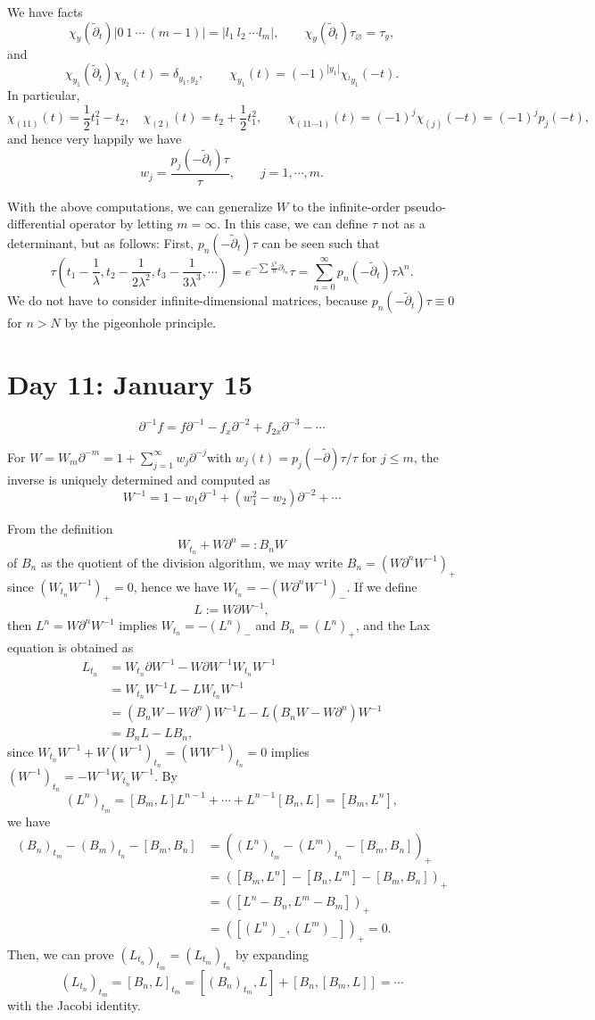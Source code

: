 \documentclass{../../../small}
\begin{document}
We have facts
\[\chi_y(\tilde\partial_t)|0\ 1\ \cdots\ (m-1)|=|l_1\ l_2\ \cdots l_m|,\qquad\chi_y(\tilde\partial_t)\tau_\varnothing=\tau_y,\]
and
\[\chi_{y_1}(\tilde\partial_t)\chi_{y_2}(t)=\delta_{y_1,y_2},\qquad\chi_{y_1}(t)=(-1)^{|y_1|}\chi_{^ty_1}(-t).\]
In particular,
\[\chi_{(11)}(t)=\frac12t_1^2-t_2,\quad\chi_{(2)}(t)=t_2+\frac12t_1^2,\qquad\chi_{(11\cdots1)}(t)=(-1)^j\chi_{(j)}(-t)=(-1)^jp_j(-t),\]
and hence very happily we have
\[w_j=\frac{p_j(-\tilde\partial_t)\tau}{\tau},\qquad j=1,\cdots,m.\]

With the above computations, we can generalize $W$ to the infinite-order pseudo-differential operator by letting $m=\infty$.
In this case, we can define $\tau$ not as a determinant, but as follows:
First, $p_n(-\tilde\partial_t)\tau$ can be seen such that
\[\tau(t_1-\frac1\lambda,t_2-\frac1{2\lambda^2},t_3-\frac1{3\lambda^3},\cdots)=e^{-\sum\frac{\lambda^n}n\partial_{t_n}}\tau=\sum_{n=0}^\infty p_n(-\tilde\partial_t)\tau\lambda^n.\]
We do not have to consider infinite-dimensional matrices, because $p_n(-\tilde\partial_t)\tau\equiv0$ for $n>N$ by the pigeonhole principle.



\newpage
\section{Day 11: January 15}

\[\partial^{-1}f=f\partial^{-1}-f_x\partial^{-2}+f_{2x}\partial^{-3}-\cdots\]

For $W=W_m\partial^{-m}=1+\sum_{j=1}^\infty w_j\partial^{-j}$with $w_j(t)=p_j(-\tilde\partial)\tau/\tau$ for $j\le m$, the inverse is uniquely determined and computed as
\[W^{-1}=1-w_1\partial^{-1}+(w_1^2-w_2)\partial^{-2}+\cdots\]

From the definition
\[W_{t_n}+W\partial^n=:B_nW\]
of $B_n$ as the quotient of the division algorithm, we may write $B_n=(W\partial^nW^{-1})_+$ since $(W_{t_n}W^{-1})_+=0$, hence we have $W_{t_n}=-(W\partial^n W^{-1})_-$.
If we define
\[L:=W\partial W^{-1},\] then $L^n=W\partial^n W^{-1}$ implies $W_{t_n}=-(L^n)_-$ and $B_n=(L^n)_+$, and the Lax equation is obtained as
\begin{align*}
L_{t_n}
&=W_{t_n}\partial W^{-1}-W\partial W^{-1}W_{t_n}W^{-1}\\
&=W_{t_n}W^{-1}L-LW_{t_n}W^{-1}\\
&=(B_nW-W\partial^n)W^{-1}L-L(B_nW-W\partial^n)W^{-1}\\
&=B_nL-LB_n,
\end{align*}
since $W_{t_n}W^{-1}+W(W^{-1})_{t_n}=(WW^{-1})_{t_n}=0$ implies $(W^{-1})_{t_n}=-W^{-1}W_{t_n}W^{-1}$.
By
\[(L^n)_{t_m}=[B_m,L]L^{n-1}+\cdots+L^{n-1}[B_n,L]=[B_m,L^n],\]
we have
\begin{align*}
(B_n)_{t_m}-(B_m)_{t_n}-[B_m,B_n]
&=((L^n)_{t_m}-(L^m)_{t_n}-[B_m,B_n])_+\\
&=([B_m,L^n]-[B_n,L^m]-[B_m,B_n])_+\\
&=([L^n-B_n,L^m-B_m])_+\\
&=([(L^n)_-,(L^m)_-])_+=0.
\end{align*}
Then, we can prove $(L_{t_n})_{t_m}=(L_{t_m})_{t_n}$ by expanding
\[(L_{t_n})_{t_m}=[B_n,L]_{t_m}=[(B_n)_{t_m},L]+[B_n,[B_m,L]]=\cdots\]
with the Jacobi identity.
\end{document}
